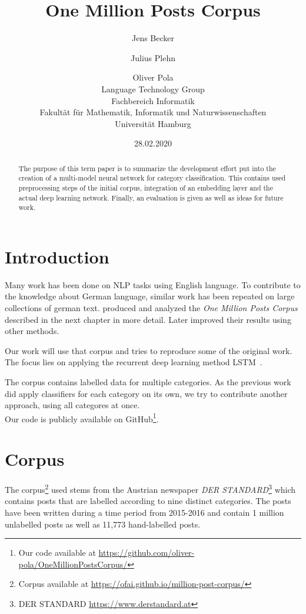 \documentclass[11pt,a4paper]{article}
\title{One Million Posts Corpus}
\author{Jens Becker \and Julius Plehn \and Oliver Pola \\ 
	Language Technology Group \\
	Fachbereich Informatik \\
	Fakultät für Mathematik, Informatik und Naturwissenschaften \\
	Universität Hamburg
}
\date{28.02.2020}
\begin{document}
\maketitle
\begin{abstract}
The purpose of this term paper is to summarize the development effort put into the creation of a multi-model neural network for category classification. This contains used preprocessing steps of the initial corpus, integration of an embedding layer and the actual deep learning network. Finally, an evaluation is given as well as ideas for future work. 

 
\end{abstract}

\section{Introduction}

Many work has been done on NLP tasks using English language.
To contribute to the knowledge about German language, similar work has been repeated on large collections of german text.
 produced and analyzed the \textit{One Million Posts Corpus} described in the next chapter in more detail. Later  improved their results using other methods.

Our work will use that corpus and tries to reproduce some of the original work.
The focus lies on applying the recurrent deep learning method LSTM~\cite{lstm}.

The corpus contains labelled data for multiple categories.
As the previous work did apply classifiers for each category on its own, we try to contribute another approach, using all categores at once.\\

Our code is publicly available on GitHub\footnote{Our code available at \url{https://github.com/oliver-pola/OneMillionPostsCorpus/}}.

\section{Corpus}
The corpus\footnote{Corpus available at \url{https://ofai.github.io/million-post-corpus/}} used stems from the Austrian newspaper \textit{DER STANDARD}\footnote{DER STANDARD \url{https://www.derstandard.at}} which contains posts that are labelled according to nine distinct categories. The posts have been written during a time period from 2015-2016 and contain 1 million unlabelled posts as well as 11,773 hand-labelled posts.
\end{document}
